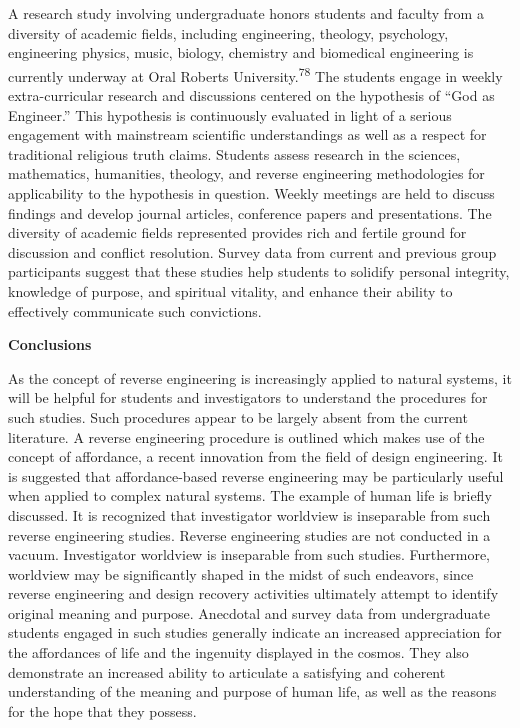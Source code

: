 A research study involving undergraduate honors students and faculty
from a diversity of academic fields, including engineering, theology,
psychology, engineering physics, music, biology, chemistry and
biomedical engineering is currently underway at Oral Roberts
University.\textsuperscript{78} The students engage in weekly
extra-curricular research and discussions centered on the hypothesis of
“God as Engineer.” This hypothesis is continuously evaluated in light
of a serious engagement with mainstream scientific understandings as
well as a respect for traditional religious truth claims. Students
assess research in the sciences, mathematics, humanities, theology, and
reverse engineering methodologies for applicability to the hypothesis
in question. Weekly meetings are held to discuss findings and develop
journal articles, conference papers and presentations. The diversity of
academic fields represented provides rich and fertile ground for
discussion and conflict resolution. Survey data from current and
previous group participants suggest that these studies help students to
solidify personal integrity, knowledge of purpose, and spiritual
vitality, and enhance their ability to effectively communicate such
convictions.


\bigskip

\bfseries
Conclusions


As the concept of reverse engineering is increasingly applied to natural
systems, it will be helpful for students and investigators to
understand the procedures for such studies. Such procedures appear to
be largely absent from the current literature. A reverse engineering
procedure is outlined which makes use of the concept of affordance, a
recent innovation from the field of design engineering. It is suggested
that affordance-based reverse engineering may be particularly useful
when applied to complex natural systems. The example of human life is
briefly discussed. It is recognized that investigator worldview is
inseparable from such reverse engineering studies. Reverse engineering
studies are not conducted in a vacuum. Investigator worldview is
inseparable from such studies. Furthermore, worldview may be
significantly shaped in the midst of such endeavors, since reverse
engineering and design recovery activities ultimately attempt to
identify original meaning and purpose. Anecdotal and survey data from
undergraduate students engaged in such studies generally indicate an
increased appreciation for the affordances of life and the ingenuity
displayed in the cosmos. They also demonstrate an increased ability to
articulate a satisfying and coherent understanding of the meaning and
purpose of human life, as well as the reasons for the hope that they
possess.



